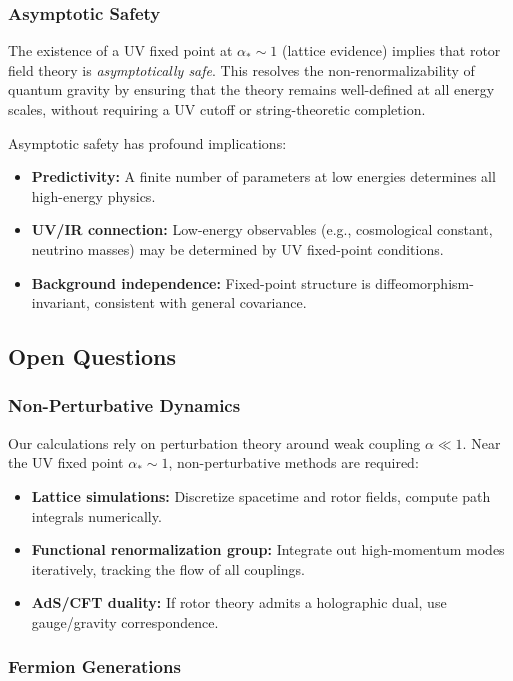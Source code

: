 \documentclass[11pt,a4paper]{article}
\numberwithin{equation}{section}
\theoremstyle{plain}
\theoremstyle{definition}
\theoremstyle{remark}
\begin{document}
\subsubsection{Asymptotic Safety}

The existence of a UV fixed point at $\alpha_*\sim 1$ (lattice evidence) implies that rotor field theory is \emph{asymptotically safe}. This resolves the non-renormalizability of quantum gravity by ensuring that the theory remains well-defined at all energy scales, without requiring a UV cutoff or string-theoretic completion.

Asymptotic safety has profound implications:
\begin{itemize}
  \item \textbf{Predictivity:} A finite number of parameters at low energies determines all high-energy physics.
  \item \textbf{UV/IR connection:} Low-energy observables (e.g., cosmological constant, neutrino masses) may be determined by UV fixed-point conditions.
  \item \textbf{Background independence:} Fixed-point structure is diffeomorphism-invariant, consistent with general covariance.
\end{itemize}

\subsection{Open Questions}

\subsubsection{Non-Perturbative Dynamics}

Our calculations rely on perturbation theory around weak coupling $\alpha\ll 1$. Near the UV fixed point $\alpha_*\sim 1$, non-perturbative methods are required:
\begin{itemize}
  \item \textbf{Lattice simulations:} Discretize spacetime and rotor fields, compute path integrals numerically.
  \item \textbf{Functional renormalization group:} Integrate out high-momentum modes iteratively, tracking the flow of all couplings.
  \item \textbf{AdS/CFT duality:} If rotor theory admits a holographic dual, use gauge/gravity correspondence.
\end{itemize}

\subsubsection{Fermion Generations}
\end{document}
